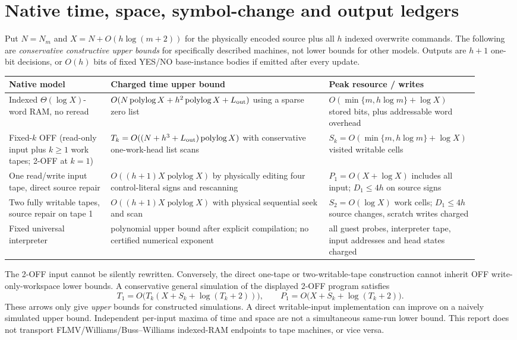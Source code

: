 \documentclass[11pt]{article}
\newcommand{\polylog}{\operatorname{polylog}}
\begin{document}
\section{Native time, space, symbol-change and output ledgers}
Put $N=N_m$ and $X=N+O(h\log(m+2))$ for the physically encoded source plus all $h$ indexed overwrite commands. The following are \emph{conservative constructive upper bounds} for specifically described machines, not lower bounds for other models. Outputs are $h+1$ one-bit decisions, or $O(h)$ bits of fixed YES/NO base-instance bodies if emitted after every update.
\begin{center}\small
\begin{tabular}{p{0.21\linewidth}p{0.45\linewidth}p{0.26\linewidth}}
\toprule
Native model & Charged time upper bound & Peak resource / writes\\
\midrule
Indexed $\Theta(\log X)$-word RAM, no reread & $O(N\polylog X+h^2\polylog X+L_{\rm out})$ using a sparse zero list & $O(\min\{m,h\log m\}+\log X)$ stored bits, plus addressable word overhead\\
Fixed-$k$ OFF (read-only input plus $k\ge1$ work tapes; 2-OFF at $k=1$) & $T_k=O((N+h^3+L_{\rm out})\polylog X)$ with conservative one-work-head list scans & $S_k=O(\min\{m,h\log m\}+\log X)$ visited writable cells\\
One read/write input tape, direct source repair & $O((h+1)X\polylog X)$ by physically editing four control-literal signs and rescanning & $P_1=O(X+\log X)$ includes all input; $D_1\le4h$ on source signs\\
Two fully writable tapes, source repair on tape 1 & $O((h+1)X\polylog X)$ with physical sequential seek and scan & $S_2=O(\log X)$ work cells; $D_1\le4h$ source changes, scratch writes charged\\
Fixed universal interpreter & polynomial upper bound after explicit compilation; no certified numerical exponent & all guest probes, interpreter tape, input addresses and head states charged\\
\bottomrule
\end{tabular}
\end{center}
The 2-OFF input cannot be silently rewritten. Conversely, the direct one-tape or two-writable-tape construction cannot inherit OFF write-only-workspace lower bounds. A conservative general simulation of the displayed 2-OFF program satisfies
\[
 T_1=O\bigl(T_k(X+S_k+\log(T_k+2))\bigr),\qquad
 P_1=O\bigl(X+S_k+\log(T_k+2)\bigr).
\]
These arrows only give \emph{upper} bounds for constructed simulations. A direct writable-input implementation can improve on a naively simulated upper bound. Independent per-input maxima of time and space are not a simultaneous same-run lower bound. This report does not transport FLMV/Williams/Buss--Williams indexed-RAM endpoints to tape machines, or vice versa.
\end{document}
